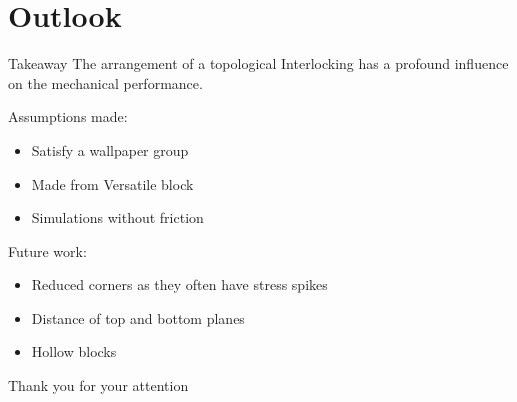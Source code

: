 \documentclass{beamer}
\numberwithin{equation}{aufgabe}
\begin{document}
\section{Outlook}
\begin{frame}
    \begin{exampleblock}{Takeaway}
        The arrangement of a topological Interlocking has a profound influence on the mechanical performance.        
    \end{exampleblock}
    \pause
    Assumptions made:
    \begin{itemize}
        \item Satisfy a wallpaper group 
        \pause
        \item Made from Versatile block 
        \pause
        \item Simulations  without friction 
    \end{itemize}
    \pause
    Future work:
    \begin{itemize}
        \item Reduced corners as they often have stress spikes
        \pause
        \item Distance of top and bottom planes
        \pause
        \item Hollow blocks
    \end{itemize}
\end{frame}

\appendix
\begin{frame}    
    Thank you for your attention \bigskip
\printbibliography 
\end{frame}
\end{document}
